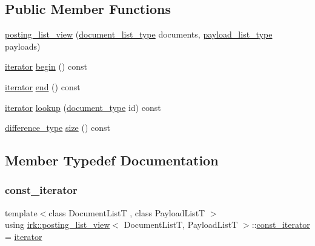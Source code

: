 \subsection*{Public Member Functions}
\begin{DoxyCompactItemize}
\item 
\mbox{\hyperlink{classirk_1_1posting__list__view_a2a67139a8790a38cffe1f20323c96bd2}{posting\+\_\+list\+\_\+view}} (\mbox{\hyperlink{classirk_1_1posting__list__view_ae024545dbbb464926a2024d956b7b7af}{document\+\_\+list\+\_\+type}} documents, \mbox{\hyperlink{classirk_1_1posting__list__view_aabf1afcb3a994971f30879354301e1fe}{payload\+\_\+list\+\_\+type}} payloads)
\item 
\mbox{\hyperlink{classirk_1_1posting__list__view_1_1iterator}{iterator}} \mbox{\hyperlink{classirk_1_1posting__list__view_a62065bb4544ebf8d6425b608a0852c11}{begin}} () const
\item 
\mbox{\hyperlink{classirk_1_1posting__list__view_1_1iterator}{iterator}} \mbox{\hyperlink{classirk_1_1posting__list__view_a57999e9c9b9347a86b242147fbd930b7}{end}} () const
\item 
\mbox{\hyperlink{classirk_1_1posting__list__view_1_1iterator}{iterator}} \mbox{\hyperlink{classirk_1_1posting__list__view_a2078e1a0c33d66cb0aa609fb8937911c}{lookup}} (\mbox{\hyperlink{classirk_1_1posting__list__view_ac4615e6e3d8ee1eb9a847b7a34919977}{document\+\_\+type}} id) const
\item 
\mbox{\hyperlink{classirk_1_1posting__list__view_aeae778b6aa26eadf11e1b799bb46547d}{difference\+\_\+type}} \mbox{\hyperlink{classirk_1_1posting__list__view_aad71ebe547caf256c8aab055c904ff19}{size}} () const
\end{DoxyCompactItemize}


\subsection{Member Typedef Documentation}
\mbox{\label{classirk_1_1posting__list__view_ae21b790c3e482f513bb41d4f8e7ae0c9}} 
\subsubsection{\texorpdfstring{const\+\_\+iterator}{const\_iterator}}
{\footnotesize\ttfamily template$<$class Document\+ListT , class Payload\+ListT $>$ \\
using \mbox{\hyperlink{classirk_1_1posting__list__view}{irk\+::posting\+\_\+list\+\_\+view}}$<$ Document\+ListT, Payload\+ListT $>$\+::\mbox{\hyperlink{classirk_1_1posting__list__view_ae21b790c3e482f513bb41d4f8e7ae0c9}{const\+\_\+iterator}} =  \mbox{\hyperlink{classirk_1_1posting__list__view_1_1iterator}{iterator}}}

